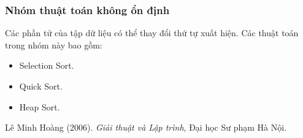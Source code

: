 \documentclass[]{article}
\begin{document}
\subsubsection{Nhóm thuật toán không ổn định}
Các phần tử của tập dữ liệu có thể thay đổi thứ tự xuất hiện. Các thuật toán trong nhóm này bao gồm:
\begin{itemize}
\item Selection Sort.
\item Quick Sort.
\item Heap Sort.
\end{itemize}

\medskip

\begin{thebibliography}{10}
Lê Minh Hoàng (2006).
\textit{Giải thuật và Lập trình}, Đại học Sư phạm Hà Nội.
\end{thebibliography}
\end{document}
